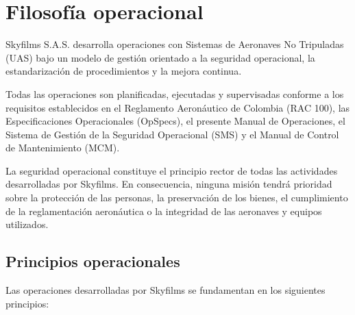 \section{Filosofía operacional}
\label{inicio_cap3}

Skyfilms S.A.S. desarrolla operaciones con Sistemas de Aeronaves No Tripuladas (UAS) bajo un modelo de gestión orientado a la seguridad operacional, la estandarización de procedimientos y la mejora continua.

Todas las operaciones son planificadas, ejecutadas y supervisadas conforme a los requisitos establecidos en el Reglamento Aeronáutico de Colombia (RAC 100), las Especificaciones Operacionales (OpSpecs), el presente Manual de Operaciones, el Sistema de Gestión de la Seguridad Operacional (SMS) y el Manual de Control de Mantenimiento (MCM).

La seguridad operacional constituye el principio rector de todas las actividades desarrolladas por Skyfilms. En consecuencia, ninguna misión tendrá prioridad sobre la protección de las personas, la preservación de los bienes, el cumplimiento de la reglamentación aeronáutica o la integridad de las aeronaves y equipos utilizados.

\subsection{Principios operacionales}

Las operaciones desarrolladas por Skyfilms se fundamentan en los siguientes principios:

